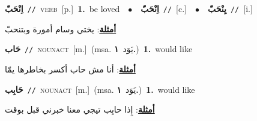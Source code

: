 \documentclass[10pt,a4paper,twoside]{article} %
\begin{document}
\begin{multicols}{2}
{\setlength\topsep{0pt}\textbf{\foreignlanguage{arabic}{اِنْحَبّ}}\ {\color{gray}\texttt{//}\color{black}}\ \textsc{verb}\ [p.]\ \textbf{1.}~be loved\ \ $\bullet$\ \ \setlength\topsep{0pt}\textbf{\foreignlanguage{arabic}{اِنْحَبّ}}\ {\color{gray}\texttt{//}\color{black}}\ [c.]\ \ $\bullet$\ \ \setlength\topsep{0pt}\textbf{\foreignlanguage{arabic}{يِنْحَبّ}}\ {\color{gray}\texttt{//}\color{black}}\ [i.]\  \begin{flushright}\color{gray}\foreignlanguage{arabic}{\textbf{\underline{\foreignlanguage{arabic}{أمثلة}}}: يختي وسام أمورة وبتنحبّ}\end{flushright}\color{black}} \vspace{2mm}

{\setlength\topsep{0pt}\textbf{\foreignlanguage{arabic}{حَاب}}\ {\color{gray}\texttt{//}\color{black}}\ \textsc{noun\textunderscore act}\ [m.]\ \color{gray}(msa. \foreignlanguage{arabic}{يَوَد}~\foreignlanguage{arabic}{\textbf{١.}})\color{black}\ \textbf{1.}~would like\  \begin{flushright}\color{gray}\foreignlanguage{arabic}{\textbf{\underline{\foreignlanguage{arabic}{أمثلة}}}: أنا مش حاب أكسر بخاطرها يمّا}\end{flushright}\color{black}} \vspace{2mm}

{\setlength\topsep{0pt}\textbf{\foreignlanguage{arabic}{حَابِب}}\ {\color{gray}\texttt{//}\color{black}}\ \textsc{noun\textunderscore act}\ [m.]\ \color{gray}(msa. \foreignlanguage{arabic}{يَوَد}~\foreignlanguage{arabic}{\textbf{١.}})\color{black}\ \textbf{1.}~would like\  \begin{flushright}\color{gray}\foreignlanguage{arabic}{\textbf{\underline{\foreignlanguage{arabic}{أمثلة}}}: إِذا حابِب تيجي معنا خبرني قبل بوقت}\end{flushright}\color{black}} \vspace{2mm}


\end{multicols}
\end{document}

